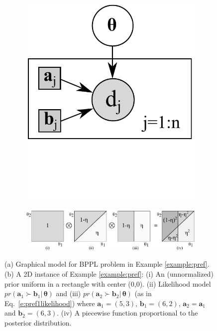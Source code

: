 \documentclass[letterpaper]{article}
\newcommand{\bvec}[1]{\textbf{#1}}
\begin{document}
\begin{figure}%
\begin{subfigure}{.19\textwidth}
\centering
\includegraphics[width=1.0\textwidth]{pic/pref2ww.pdf}
\vspace{-6mm}
\caption{}
\end{subfigure}
\begin{subfigure}{.795\textwidth}
\centering
\includegraphics[width=1.0\textwidth]{pic/running1.pdf}
\label{fig:pref}
\vspace{-1mm}
\caption{}
\end{subfigure}
\vspace{-2mm}
\caption{\footnotesize 
(a) Graphical model for BPPL problem in Example \ref{example:pref}.
(b) A 2D instance of Example \ref{example:pref}: 
(i) An (unnormalized) prior uniform in a rectangle with center (0,0).
(ii) Likelihood model $pr(\bvec{a}_1 \succ \bvec{b}_1 | \, \boldsymbol\theta)$ and
(iii) $pr(\bvec{a}_2 \succ \bvec{b}_2 | \, \boldsymbol\theta)$ 
(as in Eq.~\ref{e:pref1likelihood}) where
$\bvec{a}_1 = (5, 3)$, $\bvec{b}_1 = (6, 2)$, $\bvec{a}_2 = \bvec{a}_1$ and $\bvec{b}_2 = (6, 3)$.
(iv) A piecewise function proportional to the posterior distribution.}
\label{fig:pref-up-down}
\end{figure}
\end{document}
